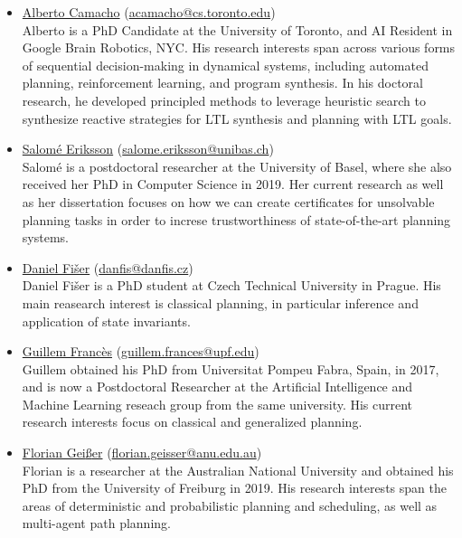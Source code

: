 \documentclass[10pt]{article}
\begin{document}
\begin{itemize}

\item \href{http://}{Alberto Camacho}
(\href{mailto:acamacho@cs.toronto.edu}{acamacho@cs.toronto.edu})\\
Alberto is a PhD Candidate at the University of Toronto, and AI Resident in
Google Brain Robotics, NYC. His research interests span across various
forms of sequential decision-making in dynamical systems, including
automated planning, reinforcement learning, and program synthesis. In
his doctoral research, he developed principled methods to leverage
heuristic search to synthesize reactive strategies for LTL synthesis and
planning with LTL goals.

\item \href{http://}{Salom\'{e} Eriksson}
(\href{mailto:salome.eriksson@unibas.ch}{salome.eriksson@unibas.ch})\\
Salom\'{e} is a postdoctoral researcher at the University of Basel, where she also received
her PhD in Computer Science in 2019. Her current research as well as her
dissertation focuses on how we can create certificates for
unsolvable planning tasks in order to increse trustworthiness of
state-of-the-art planning systems.

\item \href{http://}{Daniel Fi\v{s}er}
(\href{mailto:danfis@danfis.cz}{danfis@danfis.cz})\\
Daniel Fi\v{s}er is a PhD student at Czech Technical University in Prague.
His main reasearch interest is classical planning, in particular inference and
application of state invariants.

\item \href{https://www.upf.edu/web/ai-ml/entry/-/-/31934/adscripcion/guillem-franc%C3%A8s}{Guillem Franc\`{e}s}
    (\href{mailto:guillem.frances@upf.edu}{guillem.frances@upf.edu})\\
Guillem obtained his PhD from Universitat Pompeu Fabra, Spain, in 2017, and
is now a Postdoctoral Researcher at the Artificial Intelligence and Machine
Learning reseach group from the same university.
His current research interests focus on classical and generalized planning.

\item \href{https://cecs.anu.edu.au/people/florian-geisser}{Florian Gei{\ss}er}
(\href{mailto:florian.geisser@anu.edu.au}{florian.geisser@anu.edu.au})\\
Florian is a researcher at the Australian National University and obtained his
PhD from the University of Freiburg in 2019. His research interests span the
areas of deterministic and probabilistic planning and scheduling, as well as
multi-agent path planning.


\end{itemize}
\end{document}
